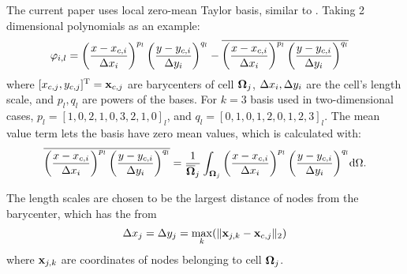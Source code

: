 The current paper uses local zero-mean Taylor basis, similar to
\cite{wang2017compact_VR}.
Taking 2 dimensional polynomials as an example:
\begin{equation}
    \begin{aligned}
        \varphi_{i,l} & =
        \left(\frac{x - x_{c,i}}{\mathrm\Delta x_i}\right)^{p_l}
        \left(\frac{y - y_{c,i}}{\mathrm\Delta y_i}\right)^{q_l}
        -
        \overline{
            \left(\frac{x - x_{c,i}}{\mathrm\Delta x_i}\right)^{p_l}
            \left(\frac{y - y_{c,i}}{\mathrm\Delta y_i}\right)^{q_l}
        }
    \end{aligned}
\end{equation}
where $[x_{c,j},y_{c,j}]^\mathrm{T} = \mathbf{x}_{c,j}$ are barycenters of cell $\mathbf{\Omega}_{j}$,
$\mathrm\Delta x_i,\mathrm\Delta y_i$ are the cell's length scale, and $p_l,q_l$ are
powers of the bases. For $k=3$ basis used in two-dimensional cases,
$p_l=[1,0,2,1,0,3,2,1,0]_l$,
and $q_l=[0,1,0,1,2,0,1,2,3]_l$.
The mean value term lets the basis have zero mean values,
which is calculated with:
\begin{equation}
    \overline{
        \left(\frac{x - x_{c,i}}{\mathrm\Delta x_i}\right)^{p_l}
        \left(\frac{y - y_{c,i}}{\mathrm\Delta y_i}\right)^{q_l}
    }
    =
    \frac{1}{\overline{\mathbf{\Omega}}_j}\int_{\mathbf{\Omega}_j}{
        \left(\frac{x - x_{c,i}}{\mathrm\Delta x_i}\right)^{p_l}
        \left(\frac{y - y_{c,i}}{\mathrm\Delta y_i}\right)^{q_l}
    }\dd \Omega .
\end{equation}

The length scales are chosen to be the largest distance of nodes from the
barycenter, which has the from
\begin{equation}
    \mathrm\Delta x_j = \mathrm\Delta y_j = \max_k(\|\mathbf{x}_{j,k} - \mathbf{x}_{c,j}\|_2)
\end{equation}
where $\mathbf{x}_{j,k}$ are coordinates of nodes belonging to cell $\mathbf{\Omega}_{j}$.


